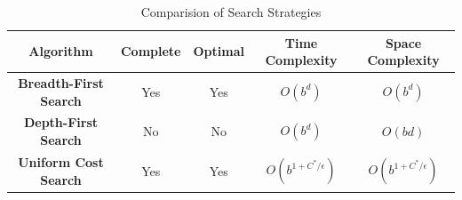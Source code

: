 \documentclass{article}
\theoremstyle{plain}
\theoremstyle{definition}
\begin{document}
\begin{table}[ht]
    \centering
    \begin{tabular}{|c|c|c|c|c|}
        \hline
        \textbf{Algorithm} & \textbf{Complete} & \textbf{Optimal} & \textbf{Time Complexity} & \textbf{Space Complexity}\\
        
        \hline 
        
        \textbf{Breadth-First Search} & Yes & Yes & $O(b^d)$ & $O(b^d)$ \\
        
        \hline
        
        \textbf{Depth-First Search} & No & No & $O(b^d)$ & $O(bd)$ \\
        
        \hline 
        
        \textbf{Uniform Cost Search} & Yes & Yes & $O(b^{1 + C^*/ \epsilon})$ & $O(b^{1 + C^*/ \epsilon})$ \\
        
        \hline 
    \end{tabular}
    \caption{Comparision of Search Strategies}
    \label{tab:my_label_xxx}
\end{table}
\end{document}
